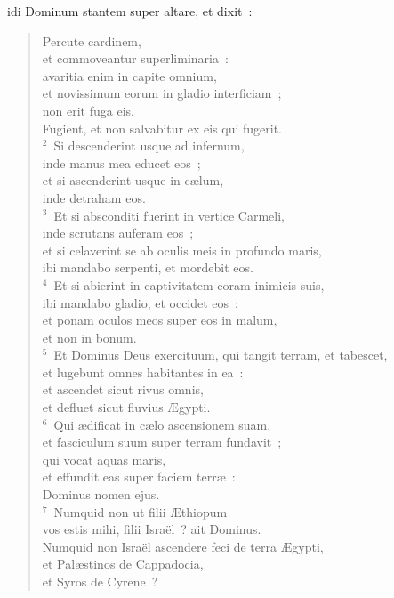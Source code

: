 \bchapter
{}idi Dominum stantem super altare, et dixit~: \begin{verse}\vspace{6pt}Percute cardinem,\\ et commoveantur superliminaria~:\\ avaritia enim in capite omnium,\\ et novissimum eorum in gladio interficiam~;\\ non erit fuga eis.\\ Fugient, et non salvabitur ex eis qui fugerit.\\
${}^{2}$~Si descenderint usque ad infernum,\\ inde manus mea educet eos~;\\ et si ascenderint usque in c\ae lum,\\ inde detraham eos.\\
${}^{3}$~Et si absconditi fuerint in vertice Carmeli,\\ inde scrutans auferam eos~;\\ et si celaverint se ab oculis meis in profundo maris,\\ ibi mandabo serpenti, et mordebit eos.\\
${}^{4}$~Et si abierint in captivitatem coram inimicis suis,\\ ibi mandabo gladio, et occidet eos~:\\ et ponam oculos meos super eos in malum,\\ et non in bonum.\\
${}^{5}$~Et Dominus Deus exercituum, qui tangit terram, et tabescet,\\ et lugebunt omnes habitantes in ea~:\\ et ascendet sicut rivus omnis,\\ et defluet sicut fluvius \AE gypti.\\
${}^{6}$~Qui \ae dificat in c\ae lo ascensionem suam,\\ et fasciculum suum super terram fundavit~;\\ qui vocat aquas maris,\\ et effundit eas super faciem terr\ae~:\\ Dominus nomen ejus.\\
${}^{7}$~Numquid non ut filii \AE thiopum\\ vos estis mihi, filii Isra\"el~? ait Dominus.\\ Numquid non Isra\"el ascendere feci de terra \AE gypti,\\ et Pal\ae stinos de Cappadocia,\\ et Syros de Cyrene~?\end{verse}


